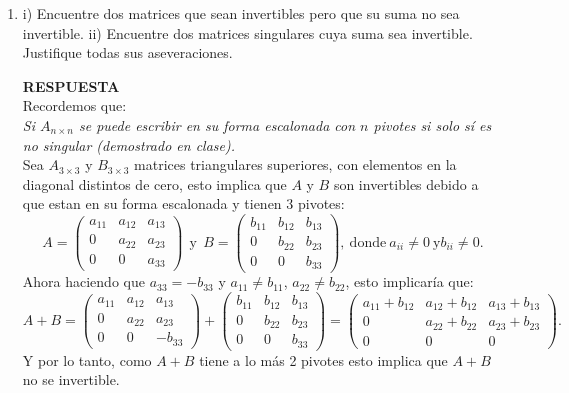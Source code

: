 \documentclass[11pt,letterpaper]{article}
\newcommand{\res}{\textbf{RESPUESTA}\\}
\begin{document}
\begin{enumerate}
\begin{equation*}
\begin{array}{c}
\begin{array}{ccc|ccc}
 0 & 1 & 0&0&1&0\\
 0 & 0 & 1&0&0&1
\end{array} \right) \Rightarrow
\begin{pmatrix}
 1 &-1 & 0\\
 0 & 1 & 0\\
 0 & 0 & 1
\end{pmatrix}^{-1}=\begin{pmatrix}
1&1&0\\
0&1&0\\
0&0&1
\end{pmatrix}.
\end{array}
\end{equation*}


\item i) Encuentre dos matrices que sean invertibles pero que su suma no sea invertible. ii) Encuentre dos matrices singulares cuya suma sea invertible. Justifique todas sus aseveraciones.

\res
Recordemos que:\\
\textit{Si $A_{n\times n}$ se puede escribir en su forma escalonada con $n$ pivotes si solo sí es no singular (demostrado en clase).}\\
Sea $A_{3\times 3}$ y $B_{3\times 3}$ matrices triangulares superiores, con elementos en la diagonal distintos de cero, esto implica que $A$ y $B$ son invertibles debido a que estan en su forma escalonada y tienen $3$ pivotes:
$$A=\begin{pmatrix}
a_{11} & a_{12}& a_{13}\\
0 & a_{22} & a_{23}\\
0 &0&a_{33}
\end{pmatrix}\ \ \text{y} \ \ B=\begin{pmatrix}
b_{11} & b_{12}& b_{13}\\
0 &b_{22} & b_{23}\\
0 &0&b_{33}
\end{pmatrix},\ \text{donde} \ a_{ii}\neq 0 \ \text{y} b_{ii}\neq 0.$$
Ahora haciendo que $a_{33}=-b_{33}$ y $a_{11}\neq b_{11}$, $a_{22}\neq b_{22}$, esto implicaría que:
$$A+B=\begin{pmatrix}
a_{11} & a_{12}& a_{13}\\
0 & a_{22} & a_{23}\\
0 &0&-b_{33}
\end{pmatrix}+\begin{pmatrix}
b_{11} & b_{12}& b_{13}\\
0 &b_{22} & b_{23}\\
0 &0&b_{33}
\end{pmatrix}=\begin{pmatrix}
a_{11}+b_{12} & a_{12}+b_{12}& a_{13}+b_{13}\\
0 & a_{22}+b_{22} & a_{23}+b_{23}\\
0 &0&0
\end{pmatrix}.$$
Y por lo tanto, como $A+B$ tiene a lo más 2 pivotes esto implica que $A+B$ no se invertible.  \\


\end{enumerate}
\end{document}
